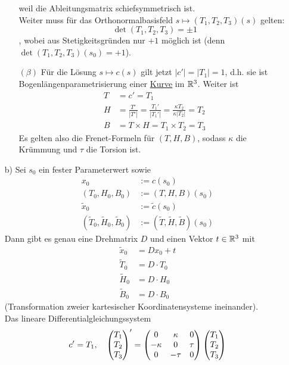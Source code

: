 \begin{beweis}
\begin{enumerate}
\begin{enumerate}
  weil die Ableitungsmatrix schiefsymmetrisch ist. \\
  Weiter muss für das Orthonormalbasisfeld \(s \mapsto (T_1, T_2, T_3)(s)\) gelten: \[\det(T_1, T_2, T_3) = \pm 1\], wobei aus Stetigkeitsgründen nur \(+1\) möglich ist \big(denn \(\det(T_1, T_2, T_3)(s_0) = +1\)\big).
  \item[\((\beta)\)] Für die Lösung \(s \mapsto c(s)\) gilt jetzt \(|c'| = |T_1| = 1\), d.h. sie ist Bogen\-längen\-para\-metri\-sierung einer \uline{Kurve} im \(\mathbb{R}^3\). Weiter ist
  \begin{align*}
   T &= c' = T_1 \\
   H &= \frac{T'}{|T'|} = \frac{T_1'}{|T_1'|} = \frac{\kappa T_2}{\kappa |T_2|} = T_2 \\
   B &= T \times H = T_1 \times T_2 = T_3
  \end{align*}
  Es gelten also die Frenet-Formeln für \((T, H, B)\), sodass \(\kappa\) die Krümmung und \(\tau\) die Torsion ist.
  \end{enumerate}
 \item[b)] Sei \(s_0\) ein fester Parameterwert sowie 
 \begin{align*}
  x_0 &:= c(s_0) \\
  (T_0, H_0, B_0) &:= (T, H, B)(s_0) \\
  \widetilde{x}_0 &:= \widetilde c(s_0) \\
  \left(\widetilde T_0, \widetilde H_0, \widetilde B_0 \right) &:= \left(\widetilde T, \widetilde H, \widetilde B\right)(s_0)
 \end{align*}
 Dann gibt es genau eine Drehmatrix \(D\) und einen Vektor \(t \in \mathbb{R}^3\) mit
 \begin{align*}
  \widetilde x_0 &= D x_0 + t \\
  \widetilde T_0 &= D \cdot T_0 \\
  \widetilde H_0 &= D \cdot H_0 \\
  \widetilde B_0 &= D \cdot B_0
 \end{align*}
 (Transformation zweier kartesischer Koordinatensysteme ineinander). \\
 Das lineare Differentialgleichungssystem
 \[
  c' = T_1, \quad \begin{pmatrix} T_1 \\ T_2 \\ T_3 \end{pmatrix} ' = \begin{pmatrix}
                                           0 & \kappa & 0 \\
                                           -\kappa & 0 & \tau \\
                                           0 & -\tau & 0
                                          \end{pmatrix} \begin{pmatrix} T_1 \\ T_2 \\ T_3 \end{pmatrix} 
\]
\end{enumerate}
\end{beweis}
